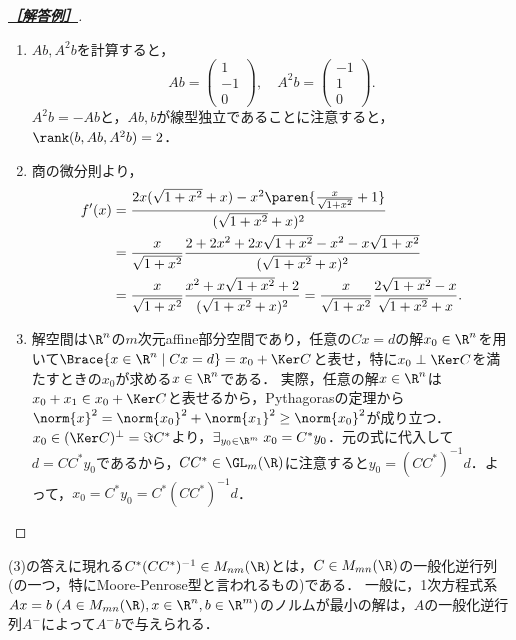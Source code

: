 \documentclass[uplatex,dvipdfmx]{jsarticle}
\begin{document}
\begin{proof}[\textbf{\underline{［解答例］}}]\mbox{}
    \begin{enumerate}
        \item $Ab,A^2b$を計算すると，
        \[Ab=\begin{pmatrix}
            1\\-1\\0
        \end{pmatrix},\quad A^2b=\begin{pmatrix}-1\\1\\0\end{pmatrix}.\]
        $A^2b=-Ab$と，$Ab,b$が線型独立であることに注意すると，$\rank(b,Ab,A^2b)=2$．
        \item 商の微分則より，
        \begin{align*}
            f'(x)&=\frac{2x(\sqrt{1+x^2}+x)-x^2\paren{\frac{x}{\sqrt{1+x^2}}+1}}{(\sqrt{1+x^2}+x)^2}\\
            &=\frac{x}{\sqrt{1+x^2}}\frac{2+2x^2+2x\sqrt{1+x^2}-x^2-x\sqrt{1+x^2}}{(\sqrt{1+x^2}+x)^2}\\
            &=\frac{x}{\sqrt{1+x^2}}\frac{x^2+x\sqrt{1+x^2}+2}{(\sqrt{1+x^2}+x)^2}=\frac{x}{\sqrt{1+x^2}}\frac{2\sqrt{1+x^2}-x}{\sqrt{1+x^2}+x}.
        \end{align*}
        \item 解空間は$\R^n$の$m$次元affine部分空間であり，任意の$Cx=d$の解$x_0\in\R^n$を用いて$\Brace{x\in\R^n\mid Cx=d}=x_0+\Ker C$と表せ，特に$x_0\perp\Ker C$を満たすときの$x_0$が求める$x\in\R^n$である．
        実際，任意の解$x\in\R^n$は$x_0+x_1\in x_0+\Ker C$と表せるから，Pythagorasの定理から$\norm{x}^2=\norm{x_0}^2+\norm{x_1}^2\ge\norm{x_0}^2$が成り立つ．
        $x_0\in(\Ker C)^\perp=\Im C^*$より，$\exists_{y_0\in\R^m}\;x_0=C^*y_0$．元の式に代入して$d=CC^*y_0$であるから，$CC^*\in\GL_m(\R)$に注意すると$y_0=(CC^*)^{-1}d$．よって，$x_0=C^*y_0=C^*(CC^*)^{-1}d$．
    \end{enumerate}
\end{proof}
\begin{remarks*}[一般化逆行列]
    (3)の答えに現れる$C^*(CC^*)^{-1}\in M_{nm}(\R)$とは，$C\in M_{mn}(\R)$の一般化逆行列(の一つ，特にMoore-Penrose型と言われるもの)である．
    一般に，1次方程式系$Ax=b\;(A\in M_{mn}(\R),x\in\R^n,b\in\R^m)$のノルムが最小の解は，$A$の一般化逆行列$A^-$によって$A^-b$で与えられる．
\end{remarks*}
\end{document}
